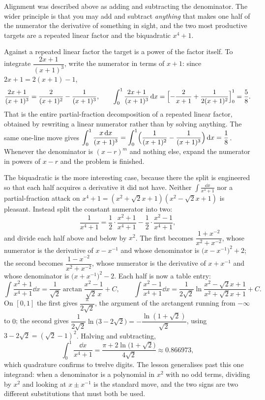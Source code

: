 Alignment was described above as adding and subtracting the denominator. The wider principle is that you may add and subtract \emph{anything} that makes one half of the numerator the derivative of something in sight, and the two most productive targets are a repeated linear factor and the biquadratic $x^4+1$.

Against a repeated linear factor the target is a power of the factor itself. To integrate $\dfrac{2x+1}{(x+1)^3}$, write the numerator in terms of $x+1$: since $2x+1=2(x+1)-1$,
\[
\frac{2x+1}{(x+1)^3}=\frac{2}{(x+1)^2}-\frac{1}{(x+1)^3},
\qquad
\int_0^1\frac{2x+1}{(x+1)^3}\,\mathrm{d} x=\Bigl[-\frac{2}{x+1}+\frac{1}{2(x+1)^2}\Bigr]_0^1=\frac58 .
\]
That is the entire partial-fraction decomposition of a repeated linear factor, obtained by rewriting a linear numerator rather than by solving anything. The same one-line move gives $\displaystyle\int_0^1\frac{x\,\mathrm{d} x}{(x+1)^3}=\int_0^1\Bigl(\frac{1}{(x+1)^2}-\frac{1}{(x+1)^3}\Bigr)\,\mathrm{d} x=\frac18$. Whenever the denominator is $(x-r)^m$ and nothing else, expand the numerator in powers of $x-r$ and the problem is finished.

The biquadratic is the more interesting case, because there the split is engineered so that each half acquires a derivative it did not have. Neither $\displaystyle\int\frac{\dd x}{x^4+1}$ nor a partial-fraction attack on $x^4+1=(x^2+\sqrt2x+1)(x^2-\sqrt2x+1)$ is pleasant. Instead split the constant numerator into two:
\[
\frac{1}{x^4+1}=\frac12\cdot\frac{x^2+1}{x^4+1}-\frac12\cdot\frac{x^2-1}{x^4+1},
\]
and divide each half above and below by $x^2$. The first becomes $\dfrac{1+x^{-2}}{x^2+x^{-2}}$, whose numerator is the derivative of $x-x^{-1}$ and whose denominator is $\bigl(x-x^{-1}\bigr)^2+2$; the second becomes $\dfrac{1-x^{-2}}{x^2+x^{-2}}$, whose numerator is the derivative of $x+x^{-1}$ and whose denominator is $\bigl(x+x^{-1}\bigr)^2-2$. Each half is now a table entry:
\[
\int\frac{x^2+1}{x^4+1}\dd x=\frac{1}{\sqrt2}\arctan\frac{x^2-1}{\sqrt2\,x}+C,
\qquad
\int\frac{x^2-1}{x^4+1}\dd x=\frac{1}{2\sqrt2}\ln\frac{x^2-\sqrt2x+1}{x^2+\sqrt2x+1}+C .
\]
On $[0,1]$ the first gives $\dfrac{\pi}{2\sqrt2}$, the argument of the arctangent running from $-\infty$ to $0$; the second gives $\dfrac{1}{2\sqrt2}\ln\bigl(3-2\sqrt2\bigr)=-\dfrac{\ln(1+\sqrt2)}{\sqrt2}$, using $3-2\sqrt2=(\sqrt2-1)^2$. Halving and subtracting,
\[
\int_0^1\frac{\dd x}{x^4+1}=\frac{\pi+2\ln\bigl(1+\sqrt2\bigr)}{4\sqrt2}\approx0.866973 ,
\]
which quadrature confirms to twelve digits. The lesson generalises past this one integrand: when a denominator is a polynomial in $x^2$ with no odd terms, dividing by $x^2$ and looking at $x\pm x^{-1}$ is the standard move, and the two signs are two different substitutions that must both be used.

